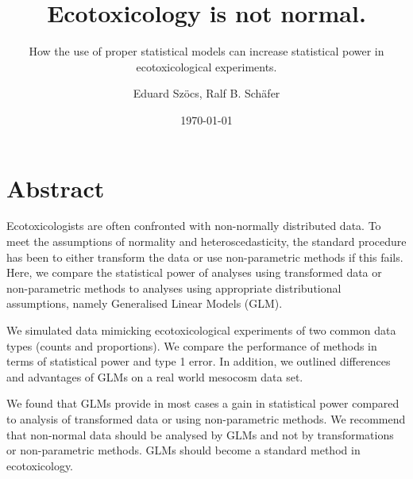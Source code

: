 \documentclass{scrartcl}
\title{Ecotoxicology is not normal.}
\subtitle{How the use of proper statistical models can increase statistical power in ecotoxicological experiments.}
\author{Eduard Szöcs, Ralf B. Schäfer}
\date{\today}
\begin{document}
\maketitle

\section*{Abstract}
Ecotoxicologists are often confronted with non-normally distributed data.
To meet the assumptions of normality and heteroscedasticity, the standard procedure has been to either transform the data or use non-parametric methods if this fails.
Here, we compare the statistical power of analyses using transformed data or non-parametric methods to analyses using appropriate distributional assumptions, namely Generalised Linear Models (GLM).

We simulated data mimicking ecotoxicological experiments of two common data types (counts and proportions). 
We compare the performance of methods in terms of statistical power and type 1 error.
In addition, we outlined differences and advantages of GLMs on a real world mesocosm data set.

We found that GLMs provide in most cases a gain in statistical power compared to analysis of transformed data or using non-parametric methods.
We recommend that non-normal data should be analysed by GLMs and not by transformations or non-parametric methods.
GLMs should become a standard method in ecotoxicology. 





\end{document}
